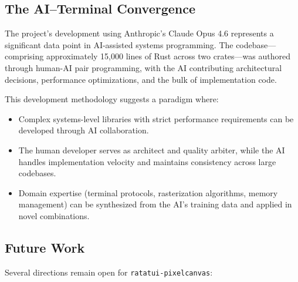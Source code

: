 \documentclass[11pt, a4paper, twocolumn]{article}
\begin{document}
\subsection{The AI--Terminal Convergence}

The project's development using Anthropic's Claude Opus 4.6 represents a significant data point in AI-assisted systems programming.
The codebase---comprising approximately 15,000 lines of Rust across two crates---was authored through human-AI pair programming, with the AI contributing architectural decisions, performance optimizations, and the bulk of implementation code.

This development methodology suggests a paradigm where:
\begin{itemize}[leftmargin=1.2em, itemsep=0.1em]
    \item Complex systems-level libraries with strict performance requirements can be developed through AI collaboration.
    \item The human developer serves as architect and quality arbiter, while the AI handles implementation velocity and maintains consistency across large codebases.
    \item Domain expertise (terminal protocols, rasterization algorithms, memory management) can be synthesized from the AI's training data and applied in novel combinations.
\end{itemize}

\subsection{Future Work}

Several directions remain open for \texttt{ratatui-pixelcanvas}:
\end{document}

